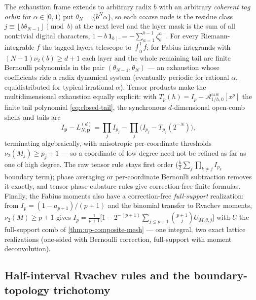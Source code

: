 \documentclass[11pt,oneside]{article}
\numberwithin{equation}{section}
\theoremstyle{definition}
\theoremstyle{remark}
\newcommand{\vtwo}{\nu_2}
\newcommand{\floor}[1]{\left\lfloor #1\right\rfloor}
\begin{document}
The exhaustion frame extends to arbitrary radix $b$ with an arbitrary
\emph{coherent tag orbit}: for $\alpha\in[0,1)$ put
$\theta_N=\{b^{N}\alpha\}$, so each coarse node is the residue class
$j\equiv\floor{b\theta_{N-1}}\pmod b$ at the next level and the layer
mask is the sum of all nontrivial digital characters,
$1-b\,\mathbf 1_{b\mid\cdot}=-\sum_{a=1}^{b-1}\zeta_b^{a\,\cdot}$.
For every Riemann-integrable $f$ the tagged layers telescope to
$\int_0^1f$; for Fabius integrands with
$(N-1)\vtwo(b)\ge d+1$ each layer and the whole remaining tail are
finite Bernoulli polynomials in the pair
$(\theta_{N-1},\theta_N)$ --- an exhaustion whose coefficients ride a
radix dynamical system (eventually periodic for rational $\alpha$,
equidistributed for typical irrational $\alpha$).  Tensor products
make the multidimensional exhaustion equally explicit: with
$T_p(h)=I_p-\mathcal A^{\mathrm{raw}}_{1/h,0}[x^{p}]$ the finite tail
polynomial \eqref{eq:closed-tail}, the synchronous $d$-dimensional
open-comb shells and tails are
\begin{equation}
 I_{\bm p}-L^{(d)}_{N,\bm p}
 =\prod_{j}I_{p_j}-\prod_{j}\bigl(I_{p_j}-T_{p_j}(2^{-N})\bigr),
 \label{eq:tensor-tail}
\end{equation}
terminating algebraically, with anisotropic per-coordinate
thresholds $\vtwo(M_j)\ge p_j+1$ --- so a coordinate of low degree
need not be refined as far as one of high degree.  The raw tensor
rule stays first order ($\tfrac h2\sum_j\prod_{k\ne j}I_{p_k}$
boundary term); phase averaging or per-coordinate Bernoulli
subtraction removes it exactly, and tensor phase-cubature rules give
correction-free finite formulas.  Finally, the Fabius moments also
have a correction-free \emph{full-support} realization: from
$I_p=(1-a_{p+1})/(p+1)$ and the binomial transfer to Rvachev moments,
$\vtwo(M)\ge p+1$ gives
$I_p=\tfrac1{p+1}\bigl[1-2^{-(p+1)}\sum_{j\le p+1}\binom{p+1}j
U_{M,\theta,j}\bigr]$ with $U$ the full-support comb of
\cref{thm:up-composite-mesh} --- one integral, two exact lattice
realizations (one-sided with Bernoulli correction, full-support with
moment deconvolution).

\subsection{Half-interval Rvachev rules and the boundary-topology
trichotomy}
\end{document}
